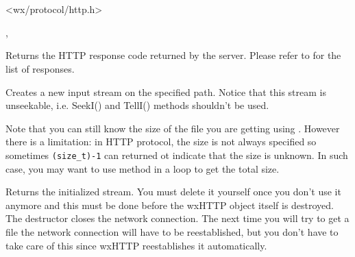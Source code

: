 \section{}\label{wxhttp}




<wx/protocol/http.h>


, 


\label{wxhttpgetresponse}


Returns the HTTP response code returned by the server. Please refer to
 for the list of responses.


\label{wxhttpgetinputstream}


Creates a new input stream on the specified path. Notice that this stream is
unseekable, i.e. SeekI() and TellI() methods shouldn't be used.

Note that you can still know the size of the file you are getting using 
. However there is a
limitation: in HTTP protocol, the size is not always specified so sometimes
\texttt{(size\_t)-1} can returned ot indicate that the size is unknown. In such
case, you may want to use  
method in a loop to get the total size.


Returns the initialized stream. You must delete it yourself once you
don't use it anymore and this must be done before the wxHTTP object itself is
destroyed. The destructor closes the network connection. The next time you will
try to get a file the network connection will have to be reestablished, but you
don't have to take care of this since wxHTTP reestablishes it automatically.

